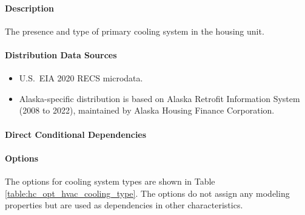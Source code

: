 \paragraph{Description}
% 
The presence and type of primary cooling system in the housing unit.

\paragraph{Distribution Data Sources}
% 
\begin{itemize}
\item U.S.~EIA 2020 RECS microdata. 
\item Alaska-specific distribution is based on Alaska Retrofit Information System (2008 to 2022), maintained by Alaska Housing Finance Corporation.
\end{itemize}

\paragraph{Direct Conditional Dependencies}


\paragraph{Options}
The options for cooling system types are shown in Table \ref{table:hc_opt_hvac_cooling_type}. The options do not assign any modeling properties but are used as dependencies in other characteristics.



